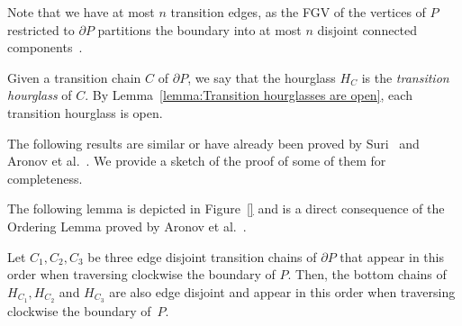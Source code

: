 \documentclass[a4paper,UKenglish]{lipics}
\begin{document}
Note that we have at most $n$ transition edges, as the FGV of the vertices of $P$ restricted to $\partial P$ partitions the boundary into at most $n$ disjoint connected components~\cite{aronov1993furthest}.

Given a transition chain $C$ of $\partial P$, we say that the hourglass $H_C$ is the \emph{transition hourglass} of $C$. By Lemma~\ref{lemma:Transition hourglasses are open}, each transition hourglass is open.

The following results are similar or have already been proved by Suri~\cite{suri1989computing} and Aronov et al.~\cite{aronov1993furthest}. We provide a sketch of the proof of some of them for completeness.

The following lemma is depicted in Figure~\ref{} and is a direct consequence of the Ordering Lemma proved by Aronov et al.~\cite[Corollary 2.7.4]{aronov1993furthest}.
\begin{lemma}\label{lemma:Ordering Lemma}
Let $C_1, C_2, C_3$ be three edge disjoint transition chains of $\partial P$ that appear in this order when traversing clockwise the boundary of $P$. Then, the bottom chains of $H_{C_1}, H_{C_2}$ and $H_{C_3}$ are also edge disjoint and appear in this order when traversing clockwise the boundary of~$P$.
\end{lemma}
\end{document}
